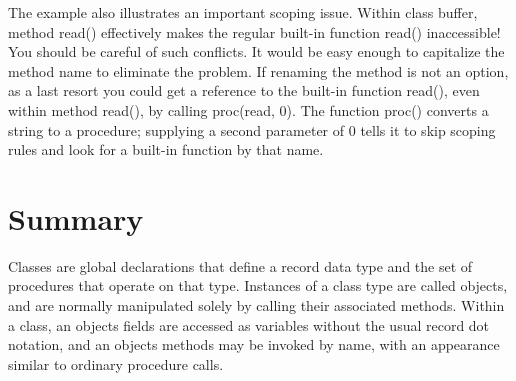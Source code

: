 The example also illustrates an important scoping issue. Within class
buffer, method \textsf{read()} effectively makes the regular built-in
function \textsf{read()} inaccessible! You should be careful of such
conflicts. It would be easy enough to capitalize the method name to
eliminate the problem. If renaming the method is not an option, as a
last resort you could get a reference to the built-in function
\textsf{read()}, even within method \textsf{read()}, by calling
\textsf{proc({\textquotedbl}read{\textquotedbl}, 0)}. The function
\textsf{proc()} converts a string to a procedure; supplying a second
parameter of 0 tells it to skip scoping rules and look for a built-in
function by that name.

\section*{Summary}

Classes are global declarations that define a record data type and the
set of procedures that operate on that type. Instances of a class type
are called objects, and are normally manipulated solely by calling
their associated methods. Within a class, an object{\textquotesingle}s
fields are accessed as variables without the usual record dot notation,
and an object{\textquotesingle}s methods may be invoked by name, with
an appearance similar to ordinary procedure calls.


\bigskip

\clearpage
\bigskip
